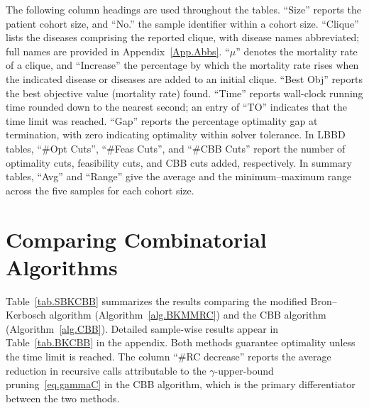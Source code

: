 The following column headings are used throughout the tables. ``Size''
reports the patient cohort size, and ``No.'' the sample identifier within
a cohort size. ``Clique'' lists the diseases comprising the reported
clique, with disease names abbreviated; full names are provided in
Appendix~\ref{App.Abbs}. ``$\mu$'' denotes the mortality rate of a clique,
and ``Increase'' the percentage by which the mortality rate rises when the
indicated disease or diseases are added to an initial clique. ``Best Obj''
reports the best objective value (mortality rate) found. ``Time'' reports
wall-clock running time rounded down to the nearest second; an entry of
``TO'' indicates that the time limit was reached. ``Gap'' reports the
percentage optimality gap at termination, with zero indicating optimality
within solver tolerance. In LBBD tables, ``\#Opt Cuts'', ``\#Feas Cuts'',
and ``\#CBB Cuts'' report the number of optimality cuts, feasibility cuts,
and CBB cuts added, respectively. In summary tables, ``Avg'' and ``Range''
give the average and the minimum--maximum range across the five samples for
each cohort size.

\section{Comparing Combinatorial Algorithms}\label{sec.CCA}

Table~\ref{tab.SBKCBB} summarizes the results comparing the modified
Bron--Kerbosch algorithm (Algorithm~\ref{alg.BKMMRC}) and the CBB algorithm
(Algorithm~\ref{alg.CBB}). Detailed sample-wise results appear in
Table~\ref{tab.BKCBB} in the appendix. Both methods guarantee
optimality unless the time limit is reached. The column ``\#RC
decrease'' reports the average reduction in recursive calls
attributable to the $\gamma$-upper-bound pruning~\eqref{eq.gammaC}
in the CBB algorithm, which is the primary differentiator between the
two methods.

